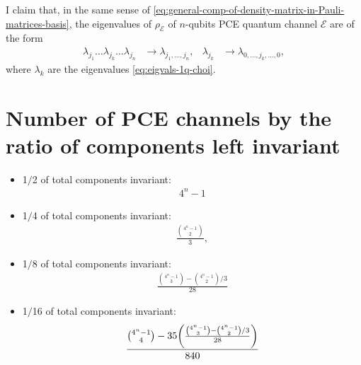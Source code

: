 \documentclass[11pt,dvipsnames]{article} %
\newcommand{\E}{\mathcal{E}}
\newcommand{\1}{\mathds{1}}
\begin{document}
I claim that, in the same sense of 
\eqref{eq:general-comp-of-density-matrix-in-Pauli-matrices-basis},
the eigenvalues of $\rho_{\E}$ of $n$-qubits PCE quantum channel
$\E$ are of the form
\begin{align}
\lambda_{j_1}\ldots \lambda_{j_k}\ldots \lambda_{j_n}
&\to\lambda_{j_1,\ldots,j_n}, &
\lambda_{j_k}&\to\lambda_{0,\ldots,j_k,\ldots,0},
\end{align}
where $\lambda_k$ are the eigenvalues \eqref{eq:eigvals-1q-choi}.

\section*{Number of PCE channels by the ratio of components 
left invariant}
\begin{itemize}
\item 1$/$2 of total components invariant:
\begin{align}
4^n-1
\end{align}

\item 1$/$4 of total components invariant:
\begin{align}
\frac{\binom{4^n-1}{2}}{3},
\end{align}

\item 1$/$8 of total components invariant:
\begin{align}
\frac{\binom{4^n-1}{3}-\binom{4^n-1}{2}/3}{28}
\end{align}

\item 1$/$16 of total components invariant:
\begin{align}
\frac{\binom{4^n-1}{4}-35\qty(\frac{\binom{4^n-1}{3}-\binom{4^n-1}{2}/3}{28})}{840}
\end{align}
\end{itemize}
\end{document}
